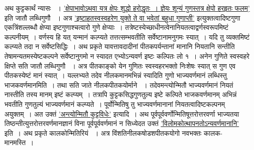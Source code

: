 \documentclass[11pt, openany]{book}
\begin{document}
\begin{sloppypar}
अथ कुट्टकार्थं न्यासः ~। \hyperref[5.58]{'क्षेपाभावोऽथवा यत्र क्षेपः शुद्धो हरोद्धृतः~। ज्ञेयः शून्यं गुणस्तत्र क्षेपो हरहृतः फलम्'} इति जातौ लब्धिगुणौ ~। अत्र \hyperref[5.59]{'इष्टाहतस्वस्वहरेण युक्ते ते वा भवेतां बहुधा गुणाप्ती'} इत्युक्तत्वादिष्टगुणा एकत्रिंशल्लब्धौ क्षेप्या इष्टगुणाश्चत्वारो गुणे क्षेप्याः~। तत्रेष्टस्येच्छाधीनत्वेनानियतत्वाद्वर्णस्वरूपमिष्टं कल्पनीयम्~। वर्णस्य हि यत् यन्मानं कल्प्यते तत्तत्सम्भवतीति सर्वेष्टानामनुगमः स्यात्~। यदि तु व्यक्तमिष्टं कल्प्यते तदा न सर्वेष्टसिद्धिः~। अथ प्रकृते यावत्तावदादीनां पीतकपर्यन्तानां मानानि नियतानि सन्तीति तेषामन्यतमस्येष्टकल्पने सर्वेष्टानुगमो न स्यादत एभ्योऽन्यवर्ण इष्टः कल्पितः लो १~। अनेन गुणिते स्वस्वहरे क्षिप्ते सति जातौ लब्धिगुणौ ~। अत्र पीतकाङ्को येन गुणितः स्वस्वहरभक्तो निःशेषः स्यात् स गुण एव पीतकस्येष्टं मानं स्यात्~। यल्लभ्यते तदेव नीलकमानमभिन्नं स्यादिति गुणो भाज्यवर्णमानं लब्धिस्तु भाजकवर्णमानमिति~। तथा सति जाते नीलकपीतकयोर्माने ~। तदेवमन्त्योन्मितौ भाज्यवर्णमानं नियतं नास्तीति तस्य मानम् इष्टं कल्प्यम्~। तत्रापि कुट्टकसिद्धगुणतुल्य इष्टे कल्पिते भाजकवर्णमानम् अभिन्नं भवतीति गुणतुल्यं भाज्यवर्णमानं कल्प्यते~। पूर्वोन्मितिषु तु भाज्यवर्णमानानां नियतत्वादिष्टकल्पनम् अयुक्तम्~। अत उक्तं \hyperref[9.134]{'अन्त्योन्मितौ कुट्टविधेः'} इत्यादि~। अथ पूर्वपूर्ववर्णोन्मितिषूत्तरोत्तरवर्णा भाज्यतया तिष्ठन्तीत्युत्तरोत्तरवर्णमानज्ञानं विना पूर्वपूर्ववर्णमानं न सिध्येदत उक्तं \hyperref[9.134]{'विलोमकोत्थापनतोऽन्यवर्णमानानि'} इति~। अथ प्रकृते कालकोन्मितिरियं ~। अत्र विंशतिनीलकषोडशपीतकयोगो नवभक्तः कालक-मानमस्ति~।
\end{sloppypar}
\end{document}

